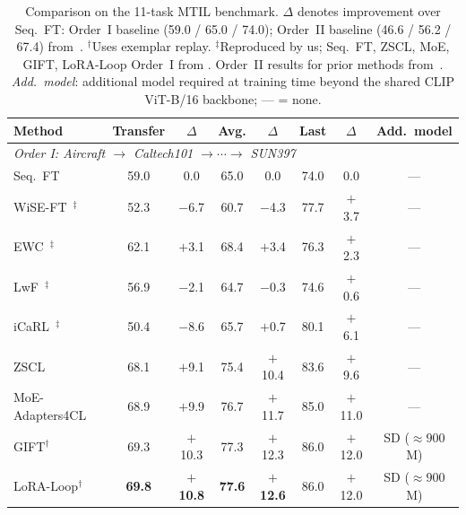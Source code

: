 \documentclass{article}
\newcommand{\dpos}[1]{\textcolor{blue!70!black}{#1}}
\newcommand{\dneg}[1]{\textcolor{orange!80!black}{#1}}
\begin{document}
  \begin{table}[t]
  \caption{Comparison on the 11-task MTIL benchmark. $\Delta$ denotes improvement
  over Seq.\ FT: Order~I baseline (59.0 / 65.0 / 74.0); Order~II baseline
  (46.6 / 56.2 / 67.4) from~\citep{gift2025}. $^\dagger$Uses exemplar replay.
  $^\ddagger$Reproduced by us; Seq.\ FT, ZSCL, MoE, GIFT, LoRA-Loop Order~I from
  \citep{zheng2023zscl,gift2025,loraloop2025}. Order~II results for prior methods
  from~\citep{gift2025,loraloop2025}. \textit{Add.\ model}: additional model
  required at training time beyond the shared CLIP ViT-B/16 backbone; {---} = none.}
  \label{tab:main_results}
  \centering
  \setlength{\tabcolsep}{4.5pt}
  \begin{tabular}{lccccccc}
  \toprule
  Method & Transfer & $\Delta$ & Avg. & $\Delta$ & Last & $\Delta$ & Add.\ model \\
  \midrule
  \multicolumn{8}{l}{\textit{Order I: Aircraft $\to$ Caltech101 $\to \cdots \to$ SUN397}} \\
  \midrule
  Seq.\ FT                                       & 59.0 & \phantom{$+$}0.0 & 65.0 & \phantom{$+$}0.0 & 74.0 & \phantom{$+$}0.0 & --- \\
  WiSE-FT~\citep{wortsman2022wiseft}$^\ddagger$ & 52.3 & \dneg{$-$6.7} & 60.7 & \dneg{$-$4.3} & 77.7 & \dpos{$+$3.7} & --- \\
  EWC~\citep{kirkpatrick2017ewc}$^\ddagger$      & 62.1 & \dpos{$+$3.1} & 68.4 & \dpos{$+$3.4} & 76.3 & \dpos{$+$2.3} & --- \\
  LwF~\citep{li2017lwf}$^\ddagger$              & 56.9 & \dneg{$-$2.1} & 64.7 & \dneg{$-$0.3} & 74.6 & \dpos{$+$0.6} & --- \\
  iCaRL~\citep{rebuffi2017icarl}$^\ddagger$     & 50.4 & \dneg{$-$8.6} & 65.7 & \dpos{$+$0.7} & 80.1 & \dpos{$+$6.1} & --- \\
  \midrule
  ZSCL~\citep{zheng2023zscl}                    & 68.1 & \dpos{$+$9.1} & 75.4 & \dpos{$+$10.4} & 83.6 & \dpos{$+$9.6} & --- \\
  MoE-Adapters4CL~\citep{yu2024moe}             & 68.9 & \dpos{$+$9.9} & 76.7 & \dpos{$+$11.7} & 85.0 & \dpos{$+$11.0} & --- \\
  GIFT$^\dagger$~\citep{gift2025}               & 69.3 & \dpos{$+$10.3}& 77.3 & \dpos{$+$12.3} & 86.0 & \dpos{$+$12.0} & SD (${\approx}900$M) \\
  LoRA-Loop$^\dagger$~\citep{loraloop2025}      & \textbf{69.8} & \dpos{$+$\textbf{10.8}} & \textbf{77.6} & \dpos{$+$\textbf{12.6}} & 86.0 & \dpos{$+$12.0} & SD (${\approx}900$M) \\

\end{tabular}
\end{table}
\end{document}
